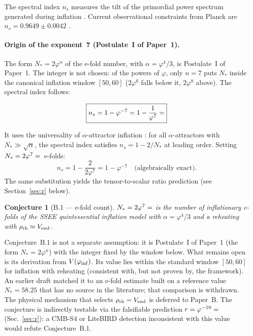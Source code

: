 \documentclass[12pt,a4paper]{article}
\newtheorem{conjecture}{Conjecture}
\begin{document}
The spectral index $n_s$ measures the tilt of the primordial power spectrum
generated during inflation \citep{Mukhanov1992,Starobinsky1980,Albrecht1982,Guth1981,Linde1982}.
Current observational constraints from Planck are $n_s = 0.9649 \pm 0.0042$
\citep{PlanckInflation2018}.

\paragraph{Origin of the exponent~7 (Postulate~I of Paper~1).}
The form $N_*=2\varphi^n$ of the e-fold number, with $\alpha=\varphi^4/3$, is
Postulate~I of Paper~1. The integer is not chosen: of the powers of $\varphi$,
only $n=7$ puts $N_*$ inside the canonical inflation window $[50,60]$
($2\varphi^6$ falls below it, $2\varphi^8$ above). The spectral index follows:

\begin{equation}
\boxed{n_s = 1 - \varphi^{-7} = 1 - \frac{1}{\varphi^7} = \val{N_S_d6}}
\label{eq:ns}
\end{equation}

It uses the universality of $\alpha$-attractor inflation \citep{Kallosh2013}: for all
$\alpha$-attractors with $N_\ast \gg \sqrt\alpha$, the spectral index satisfies
$n_s = 1 - 2/N_\ast$ at leading order. Setting $N_\ast = 2\varphi^7 = \val{dos_phi7_d6}$~e-folds:
\begin{equation}
n_s = 1 - \frac{2}{2\varphi^7} = 1 - \varphi^{-7} \quad \text{(algebraically exact)}.
\end{equation}
The same substitution yields the tensor-to-scalar ratio prediction (see
Section~\ref{sec:r} below).

\begin{conjecture}[B.1 — e-fold count]
$N_\ast = 2\varphi^7 = \val{dos_phi7_d6}$ is the number of inflationary e-folds of the
SSEE quintessential inflation model with $\alpha = \varphi^4/3$ and a reheating with
$\rho_{\rm rh}\approx V_{\rm end}$.
\end{conjecture}

Conjecture~B.1 is not a separate assumption: it is Postulate~I of Paper~1 (the form
$N_*=2\varphi^n$) with the integer fixed by the window below. What remains open is its
derivation from $V(\varphi_{\rm inf})$.
Its value lies within the standard window $[50,60]$ for inflation with reheating
(consistent with, but not proven by, the framework). An earlier draft matched it to an
e-fold estimate built on a reference value $N_\ast=58.25$ that has no source in the
literature; that comparison is withdrawn. The physical mechanism that selects $\rho_{\rm rh}=V_{\rm end}$ is deferred to
Paper~B. The conjecture is indirectly testable via the falsifiable prediction
$r = \varphi^{-10} = \val{R_TENSOR_d6}$ (Sec.~\ref{sec:r}): a CMB-S4 or LiteBIRD detection
inconsistent with this value would refute Conjecture~B.1.
\end{document}
